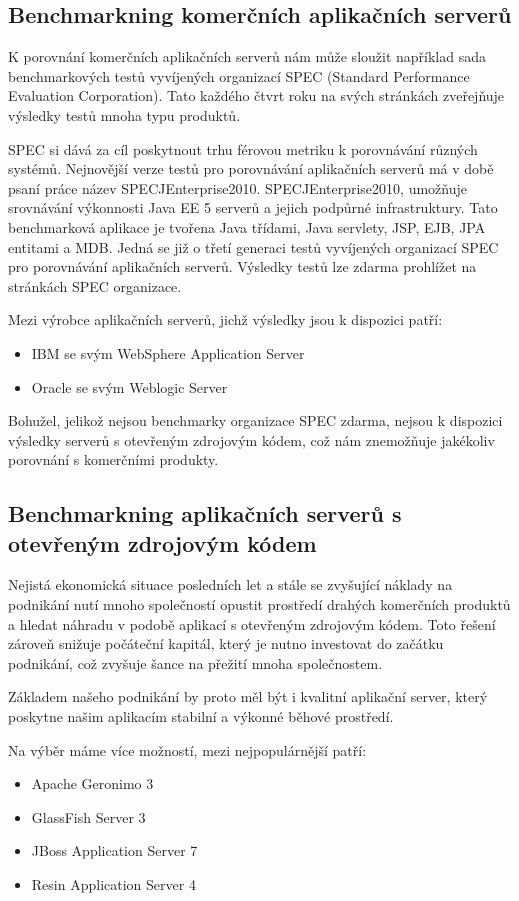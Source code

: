 \documentclass[122pt,oneside]{fithesis}
\begin{document}
\subsection{Benchmarkning komerčních aplikačních serverů}
K porovnání komerčních aplikačních serverů nám může  sloužit například sada benchmarkových testů vyvíjených organizací SPEC (Standard Performance Evaluation Corporation). Tato každého čtvrt roku na svých stránkách zveřejňuje výsledky testů mnoha typu produktů.

SPEC si dává za cíl poskytnout trhu férovou metriku k porovnávání různých systémů. Nejnovější verze testů pro porovnávání aplikačních serverů má v době psaní práce název SPECJEnterprise2010. SPECJEnterprise2010, umožňuje srovnávání výkonnosti Java EE 5 serverů a jejich podpůrné infrastruktury. Tato benchmarková aplikace je tvořena Java třídami, Java servlety, JSP, EJB, JPA entitami a MDB. Jedná se již o třetí generaci testů vyvíjených organizací SPEC pro porovnávání aplikačních serverů. Výsledky testů lze zdarma prohlížet na stránkách SPEC organizace.

Mezi výrobce aplikačních serverů, jichž výsledky jsou k dispozici patří:
\begin{itemize}
  \item IBM se svým WebSphere Application Server
  \item Oracle se svým Weblogic Server
\end{itemize}
Bohužel, jelikož nejsou benchmarky organizace SPEC zdarma, nejsou k dispozici výsledky serverů s otevřeným zdrojovým kódem, což nám znemožňuje jakékoliv porovnání s komerčními produkty.

\subsection{Benchmarkning aplikačních serverů s otevřeným zdrojovým kódem}
Nejistá ekonomická situace posledních let a stále se zvyšující náklady na podnikání nutí mnoho společností opustit prostředí drahých komerčních produktů a hledat náhradu v podobě aplikací s otevřeným zdrojovým kódem. Toto řešení zároveň snižuje počáteční kapitál, který je nutno investovat do začátku podnikání, což zvyšuje šance na přežití mnoha společnostem.

Základem našeho podnikání by proto měl být i kvalitní aplikační server, který poskytne našim aplikacím stabilní a výkonné běhové prostředí.

Na výběr máme více možností, mezi nejpopulárnější patří:
\begin{itemize}
  \item Apache Geronimo 3
  \item GlassFish Server 3
  \item JBoss Application Server 7
  \item Resin Application Server 4
\end{itemize}
\end{document}
